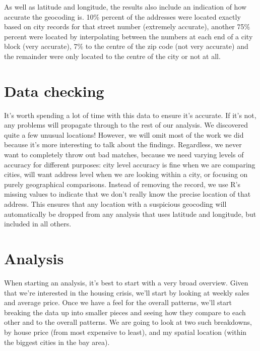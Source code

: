\documentclass[oneside]{article}
\begin{document}
As well as latitude and longitude, the results also include an indication of how accurate the geocoding is.  10\%  percent of the addresses were located exactly based on city records for that street number (extremely accurate), another 75\% percent were located by interpolating between the numbers at each end of a city block (very accurate), 7\% to the centre of the zip code (not very accurate) and the remainder were only located to the centre of the city or not at all.  


\section{Data checking}

It's worth spending a lot of time with this data to ensure it's accurate.  If it's not, any problems will propagate through to the rest of our analysis.  We discovered quite a few unusual locations!  However, we will omit most of the work we did because it's more interesting to talk about the findings.  Regardless, we never want to completely throw out bad matches, because we need varying levels of accuracy for different purposes: city level accuracy is fine when we are comparing cities, will want address level when we are looking within a city, or focusing on purely geographical comparisons.  Instead of removing the record, we use R's missing values to indicate that we don't really know the precise location of that address.  This ensures that any location with a suspicious geocoding will automatically be dropped from any analysis that uses latitude and longitude, but included in all others.

\section{Analysis}

When starting an analysis, it's best to start with a very broad overview.  Given that we're interested in the housing crisis, we'll start by looking at weekly sales and average price.  Once we have a feel for the overall patterns, we'll start breaking the data up into smaller pieces and seeing how they compare to each other and to the overall patterns.  We are going to look at two such breakdowns, by house price (from most expensive to least), and my spatial location (within the biggest cities in the bay area).
\end{document}

